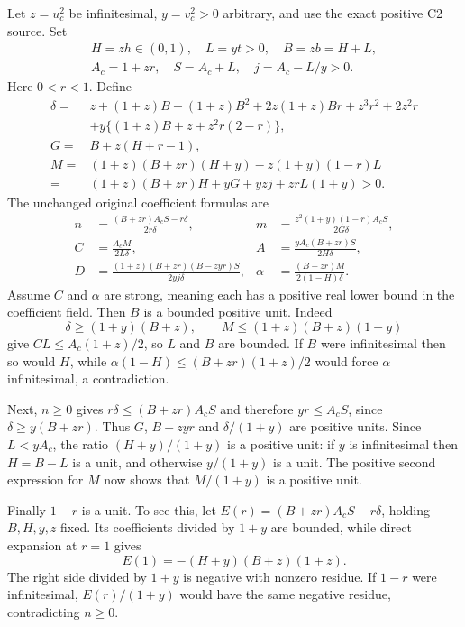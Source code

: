 \label{pf5726218aec8:sec:strong-angle-entry}
Let $z=u_c^2$ be infinitesimal, $y=v_c^2>0$ arbitrary, and use the exact
positive C2 source. Set
\[
 \begin{gathered}
 H=zh\in(0,1),\quad L=yt>0,\quad B=zb=H+L,\\
 A_c=1+zr,\quad S=A_c+L,\quad j=A_c-L/y>0.
 \end{gathered}
\]
Here $0<r<1$. Define
\begin{align*}
 \delta={}&z+(1+z)B+(1+z)B^2+2z(1+z)Br+z^3r^2+2z^2r\\
 &+y\{(1+z)B+z+z^2r(2-r)\},\\
 G={}&B+z(H+r-1),\\
 M={}&(1+z)(B+zr)(H+y)-z(1+y)(1-r)L\\
 ={}&(1+z)(B+zr)H+yG+yzj+zrL(1+y)>0.
\end{align*}
The unchanged original coefficient formulas are
\begin{align*}
 n&=\frac{(B+zr)A_cS-r\delta}{2r\delta},&
 m&=\frac{z^2(1+y)(1-r)A_cS}{2G\delta},\\
 C&=\frac{A_cM}{2L\delta},&
 A&=\frac{yA_c(B+zr)S}{2H\delta},\\
 D&=\frac{(1+z)(B+zr)(B-zyr)S}{2yj\delta},&
 \alpha&=\frac{(B+zr)M}{2(1-H)\delta}.
\tag{GE1}
\end{align*}
Assume $C$ and $\alpha$ are strong, meaning each has a positive real
lower bound in the coefficient field. Then $B$ is a bounded positive
unit. Indeed
\[
 \delta\ge(1+y)(B+z),\qquad
 M\le(1+z)(B+z)(1+y)
\]
give $CL\le A_c(1+z)/2$, so $L$ and $B$ are bounded.
If $B$ were infinitesimal then so would $H$, while
$\alpha(1-H)\le(B+zr)(1+z)/2$ would force $\alpha$ infinitesimal,
a contradiction.

Next, $n\ge0$ gives $r\delta\le(B+zr)A_cS$ and therefore
$yr\le A_cS$, since $\delta\ge y(B+zr)$.
Thus $G$, $B-zyr$ and $\delta/(1+y)$ are positive units.
Since $L<yA_c$, the ratio $(H+y)/(1+y)$ is a positive unit: if $y$
is infinitesimal then $H=B-L$ is a unit, and otherwise $y/(1+y)$
is a unit. The positive second expression for $M$ now shows that
$M/(1+y)$ is a positive unit.

Finally $1-r$ is a unit. To see this, let
$E(r)=(B+zr)A_cS-r\delta$, holding $B,H,y,z$ fixed.
Its coefficients divided by $1+y$ are bounded, while direct expansion
at $r=1$ gives
\[
 E(1)=-(H+y)(B+z)(1+z).
\]
The right side divided by $1+y$ is negative with nonzero residue.
If $1-r$ were infinitesimal, $E(r)/(1+y)$ would have the same negative
residue, contradicting $n\ge0$.

